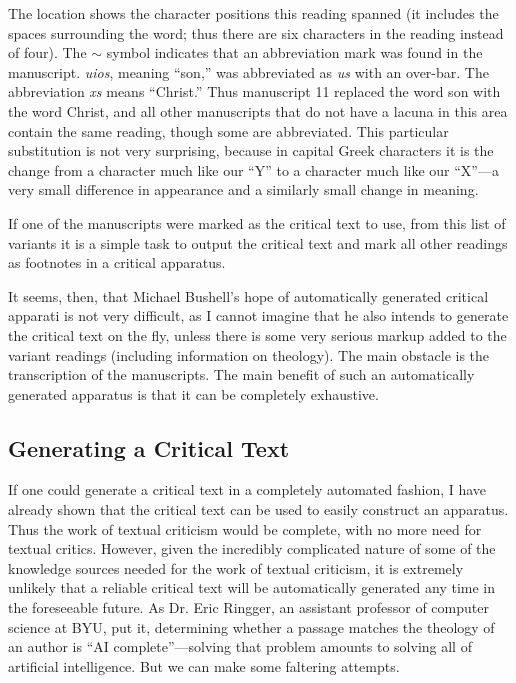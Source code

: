 \documentclass[onecolumn, 12pt]{article}
\begin{document}
The location shows the character positions this reading spanned (it includes
the spaces surrounding the word; thus there are six characters in the reading
instead of four).  The $\sim$ symbol indicates that an abbreviation mark was
found in the manuscript.  \emph{uios}, meaning ``son,'' was abbreviated as
\emph{us} with an over-bar.  The abbreviation \emph{xs} means ``Christ.''  Thus
manuscript 11 replaced the word son with the word Christ, and all other
manuscripts that do not have a lacuna in this area contain the same reading,
though some are abbreviated.  This particular substitution is not very
surprising, because in capital Greek characters it is the change from a
character much like our ``Y'' to a character much like our ``X''---a very small
difference in appearance and a similarly small change in meaning.

If one of the manuscripts were marked as the critical text to use, from this
list of variants it is a simple task to output the critical text and mark all
other readings as footnotes in a critical apparatus.

It seems, then, that Michael Bushell's hope of automatically generated critical
apparati is not very difficult, as I cannot imagine that he also intends to
generate the critical text on the fly, unless there is some very serious markup
added to the variant readings (including information on theology).  The main
obstacle is the transcription of the manuscripts.  The main benefit of such an
automatically generated apparatus is that it can be completely exhaustive.

\subsection{Generating a Critical Text}

If one could generate a critical text in a completely automated fashion, I have
already shown that the critical text can be used to easily construct an
apparatus.  Thus the work of textual criticism would be complete, with no more
need for textual critics.  However, given the incredibly complicated nature of
some of the knowledge sources needed for the work of textual criticism, it is
extremely unlikely that a reliable critical text will be automatically
generated any time in the foreseeable future.  As Dr. Eric Ringger, an
assistant professor of computer science at BYU, put it, determining whether a
passage matches the theology of an author is ``AI complete''---solving that
problem amounts to solving all of artificial intelligence.  But we can make
some faltering attempts.
\end{document}
